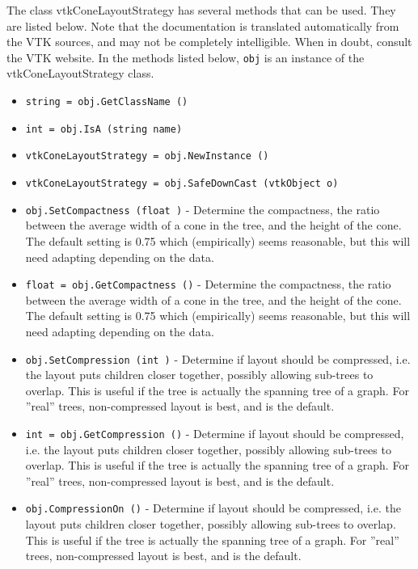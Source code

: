 The class vtkConeLayoutStrategy has several methods that can be used.
  They are listed below.
Note that the documentation is translated automatically from the VTK sources,
and may not be completely intelligible.  When in doubt, consult the VTK website.
In the methods listed below, \verb|obj| is an instance of the vtkConeLayoutStrategy class.
\begin{itemize}
\item  \verb|string = obj.GetClassName ()|

\item  \verb|int = obj.IsA (string name)|

\item  \verb|vtkConeLayoutStrategy = obj.NewInstance ()|

\item  \verb|vtkConeLayoutStrategy = obj.SafeDownCast (vtkObject o)|

\item  \verb|obj.SetCompactness (float )| -  Determine the compactness, the ratio between the
 average width of a cone in the tree, and the 
 height of the cone.  The default setting is 0.75
 which (empirically) seems reasonable, but this
 will need adapting depending on the data.

\item  \verb|float = obj.GetCompactness ()| -  Determine the compactness, the ratio between the
 average width of a cone in the tree, and the 
 height of the cone.  The default setting is 0.75
 which (empirically) seems reasonable, but this
 will need adapting depending on the data.

\item  \verb|obj.SetCompression (int )| -  Determine if layout should be compressed, i.e. the 
 layout puts children closer together, possibly allowing
 sub-trees to overlap.  This is useful if the tree is 
 actually the spanning tree of a graph.  For ''real'' trees, 
 non-compressed layout is best, and is the default.

\item  \verb|int = obj.GetCompression ()| -  Determine if layout should be compressed, i.e. the 
 layout puts children closer together, possibly allowing
 sub-trees to overlap.  This is useful if the tree is 
 actually the spanning tree of a graph.  For ''real'' trees, 
 non-compressed layout is best, and is the default.

\item  \verb|obj.CompressionOn ()| -  Determine if layout should be compressed, i.e. the 
 layout puts children closer together, possibly allowing
 sub-trees to overlap.  This is useful if the tree is 
 actually the spanning tree of a graph.  For ''real'' trees, 
 non-compressed layout is best, and is the default.


\end{itemize}
